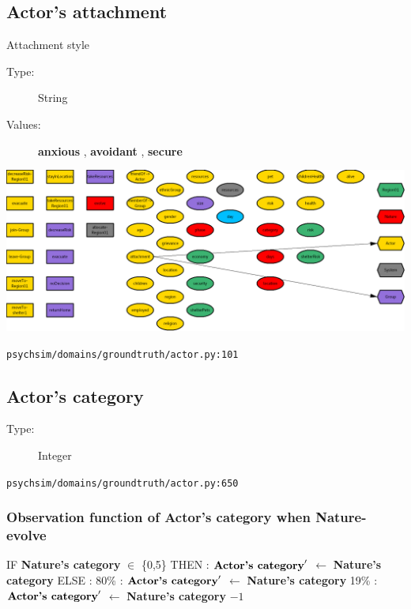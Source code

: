 \documentclass{article}%
\begin{document}
%
\subsection{Actor's attachment}%
\label{subsec:Actor's attachment}%
Attachment style%
\begin{description}%
\item[Type:]%
String%
\item[Values:]%
\textbf{anxious}%
, %
\textbf{avoidant}%
, %
\textbf{secure}%
\end{description}%
\includegraphics[width=\textwidth]{images/attachmentOfActor.png}%
\begin{flushleft}%
\verb|psychsim/domains/groundtruth/actor.py:101|%
\end{flushleft}

%
\subsection{Actor's category}%
\label{subsec:Actor's category}%
\begin{description}%
\item[Type:]%
Integer%
\end{description}%
\begin{flushleft}%
\verb|psychsim/domains/groundtruth/actor.py:650|%
\end{flushleft}%
\subsubsection{Observation function of Actor's category when Nature{-}evolve}%
\label{ssubsec:Observation function of Actor's category when Nature{-}evolve}%
\begin{flushleft}%
IF %
\textbf{Nature's category}%
$\in$%
\{0,5\}%
\linebreak%
\hspace*{2em}%
THEN %
: %
$\mbox{\textbf{Actor's category}} '$%
$\leftarrow$%
\textbf{Nature's category}%
\linebreak%
\hspace*{2em}%
ELSE %
: %
\linebreak%
\hspace*{4em}%
80\%%
: %
$\mbox{\textbf{Actor's category}} '$%
$\leftarrow$%
\textbf{Nature's category}%
\linebreak%
\hspace*{4em}%
19\%%
: %
$\mbox{\textbf{Actor's category}} '$%
$\leftarrow$%
\textbf{Nature's category}%
${-}1$%
\end{flushleft}
\end{document}
